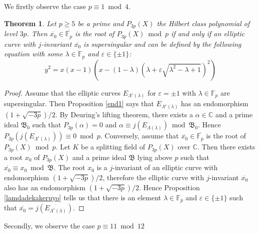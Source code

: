 \documentclass[a4paper, 11pt]{article}
\theoremstyle{plain}
\newtheorem{thm}[defn]{Theorem}
\newcommand{\?}{\textcolor{red}{??}}
\newcommand{\lm}{\lambda}
\newcommand{\Lm}{\Lambda}
\newcommand{\fp}{\mathbb{F}_p}
\newcommand{\bC}{\mathbb{C}}
\begin{document}
We firstly observe the case $p \equiv 1 \bmod 4$.
\begin{thm}
\label{important}
    Let $p\ge 5$ be a prime and $P_{3p}(X)$ the Hilbert class polynomial of level $3p$. Then $\overline{x_0} \in \overline{\fp}$ is the root of $P_{3p}(X) \bmod p$ if and only if an elliptic curve with $j$-invariant $\overline{x_0}$ is supersingular and can be defined by the following equation with some $\lm\in\fp$ and $\varepsilon \in \{\pm1\}$:
    \[
    y^2=x(x-1)(x-(1-\lm)(\lm+\varepsilon\sqrt{\lm^2-\lm+1})^2)
    \] 
\end{thm}
\begin{proof}
Assume that the elliptic curves $E_{\Lm^{\varepsilon}(\lm)}$ for $\varepsilon=\pm1$ with $\lm \in \fp$ are supersingular. Then Proposition \ref{end1} says that $E_{\Lm^{\varepsilon}(\lm)}$ has an endomorphism $(1+\sqrt{-3p})/2$. By Deuring's lifting theorem, there exists a $\alpha\in \bC$ and a prime ideal $\mathfrak{B}_0$ such that $P_{3p}(\alpha)=0$ and $\alpha \equiv j(E_{\Lm(\lm)}) \bmod \mathfrak{B}_0$. Hence $P_{3p}(j(E_{\Lm^{\varepsilon}(\lm)}) ) \equiv0 \bmod p$. Conversely, assume that $\overline{x_0} \in \overline{\fp}$ is the root of $P_{3p}(X) \bmod p$.  Let $K$ be a splitting field of $P_{3p}(X)$ over $\bC$. Then there exists a root $x_0$ of $P_{3p}(X)$ and a prime ideal $\mathfrak{B}$ lying above $p$ such that $\overline{x_0} \equiv x_0\bmod \mathfrak{B}$. The root $x_0$ is a $j$-invariant of an elliptic curve with endomorphism $(1+\sqrt{-3p})/2$, therefore the elliptic curve with $j$-invariant $\overline{x_0}$ also has an endomorphism $(1+\sqrt{-3p})/2$. Hence Proposition \ref{lamdadekakeruyo} tells us that there is an element $\lm \in \fp$ and $\varepsilon\in\{\pm1\}$ such that $\overline{x_0}=j(E_{\Lm^{\varepsilon}(\lm)})$. 
\end{proof}

Secondly, we observe the case $p \equiv 11 \bmod 12$
\end{document}
